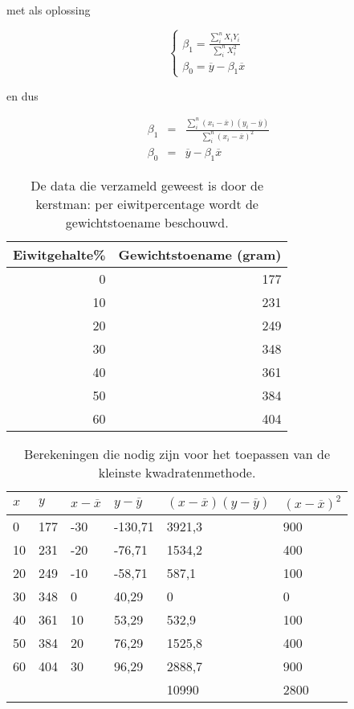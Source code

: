 \begin{theorem}
	
  met als oplossing

  \begin{equation}
    \begin{cases}
      \beta_{1} = \frac{\sum_{i}^{n} X_{i}Y_{i}}{\sum_{i}^{n} X_{i}^{2}}\\
      \beta_{0} = \overline{y} - \beta_{1}\overline{x}
    \end{cases}
    \label{eq:vgl2}
  \end{equation}

  en dus

  \begin{eqnarray}
    \beta_{1} & = & \frac{\sum_{i}^{n} (x_{i} - \overline{x})(y_{i} - \overline{y})}{\sum_{i}^{n} (x_{i} - \overline{x})^{2}} \\
    \beta_{0} & = & \overline{y} - \beta_{1} \overline{x}
    \label{eq:regressie}
  \end{eqnarray}
\end{theorem}


\begin{table} \centering
  \begin{tabular}{@{}rr@{}} \toprule
    Eiwitgehalte\%& Gewichtstoename (gram)  \\
    \midrule
    0		&	177 \\
    10 	&	231	\\
    20	& 249	\\
    30	& 348 \\
    40	& 361 \\
    50	& 384 \\
    60	& 404 \\
    \bottomrule
  \end{tabular}
  \caption{De data die verzameld geweest is door de kerstman: per eiwitpercentage wordt de gewichtstoename beschouwd.}
  \label{tab:rendieren}
\end{table}



\begin{table} \centering
  \begin{tabular}{@{}llllll@{}}
    \toprule
    $x$   & $y$     & $x-\overline{x}$    & $y - \overline{y}$        & $(x-\overline{x})(y - \overline{y})$       &  $(x-\overline{x})^{2}$    \\ \midrule
    0  & 177 & -30 & -130,71 & 3921,3 & 900  \\
    10 & 231 & -20 & -76,71  & 1534,2 & 400  \\
    20 & 249 & -10 & -58,71  & 587,1  & 100  \\
    30 & 348 & 0   & 40,29   & 0      & 0    \\
    40 & 361 & 10  & 53,29   & 532,9  & 100  \\
    50 & 384 & 20  & 76,29   & 1525,8 & 400  \\
    60 & 404 & 30  & 96,29   & 2888,7 & 900  \\
    &     &     &         & 10990  & 2800 \\ \bottomrule
  \end{tabular}
  \caption{Berekeningen die nodig zijn voor het toepassen van de kleinste kwadratenmethode.}
  \label{tab:rendieren2}
\end{table}

